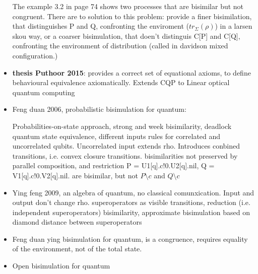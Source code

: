 \begin{itemize}
The example 3.2 in page 74 shows two processes that are bisimilar but not congruent. There are to solution to this problem: provide a finer bisimilation, that distinguishes P and Q, confronting the enviroment ($tr_\Sigma(\rho)$) in a larsen skou way, or a coarser bisimulation, that doen't distinguis C[P] and C[Q], confronting the environment of distribution (called in davidson mixed configuration.)


\item \textbf{thesis Puthoor 2015}:
provides a correct set of equational axioms, to define behavioural equivalence axiomatically. Extends CQP to Linear optical quantum computing
\end{itemize}


\begin{itemize}
\item Feng duan 2006, probabilistic bisimulation for quantum:

Probabilities-on-state approach, strong and week bisimilarity, deadlock quantum state equivalence, different inputs rules for correlated and uncorrelated qubits. Uncorrelated input extends rho. Introduces conbined transitions, i.e. convex closure transitions. bisimilarities not preserved by parallel composition, and restriction 
P = U1[q].c!0.U2[q].nil, Q = V1[q].c!0.V2[q].nil. are bisimilar, but not $P\setminus c$ and $Q\setminus c$
\item Ying feng 2009, an algebra of quantum, no classical comunxication. Input and output don't change rho. superoperators as visible transitions, reduction (i.e. independent superoperators) bisimilarity, approximate bisimulation based on diamond distance between superoperators

\item Feng duan ying bisimulation for quantum, is a congruence, requires equality of the environment, not of the total state. 
\item Open bisimulation for quantum
\end{itemize}